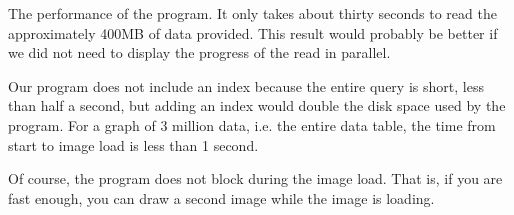 \documentclass[
]{article}
\begin{document}
The performance of the program. It only takes about thirty seconds to
read the approximately 400MB of data provided. This result would
probably be better if we did not need to display the progress of the
read in parallel.

Our program does not include an index because the entire query is short,
less than half a second, but adding an index would double the disk space
used by the program. For a graph of 3 million data, i.e. the entire data
table, the time from start to image load is less than 1 second.

Of course, the program does not block during the image load. That is, if
you are fast enough, you can draw a second image while the image is
loading.
\end{document}
